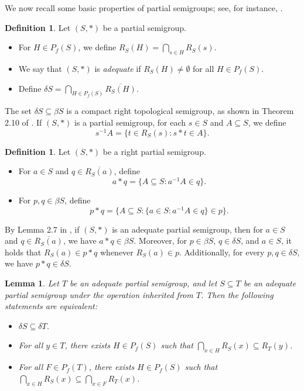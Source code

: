 \documentclass{amsart}
\newtheorem{lemma}[theorem]{Lemma}
\theoremstyle{definition}
\newtheorem{definition}[theorem]{Definition}
\theoremstyle{remark}
\numberwithin{equation}{section}
\begin{document}
We now recall some basic properties of partial semigroups; see, for instance, \cite{Hindman}.
\begin{definition}
	Let \((S, *)\) be a partial semigroup.
	\begin{itemize}
		\item[(a)] For \( H \in P_f(S) \), we define \( R_S(H) = \bigcap_{s \in H} R_S(s) \).	
		\item[(b)] We say that \((S, *)\) is \emph{adequate} if \( R_S(H) \neq \emptyset \) for all \( H \in P_f(S) \).
		\item[(c)] Define $\delta S = \bigcap_{H \in P_f(S)} \overline{R_S(H)}$.
	\end{itemize}
\end{definition}

The set $\delta S \subseteq \beta S$ is a compact right topological semigroup, as shown in Theorem 2.10 of \cite{McCutcheon}. If \((S, *)\) is a partial semigroup, for each \( s \in S \) and \( A \subseteq S \), we define 
\[
s^{-1}A = \{t \in R_S(s) : s * t \in A\}.
\]

\begin{definition}
	Let \( (S, *) \) be a right partial semigroup.
	\begin{itemize}
		\item[(a)] For \( a \in S \) and \( q \in \overline{R_S(a)} \), define
		\[
		a * q = \{A \subseteq S \colon a^{-1}A \in q\}.
		\]
		\item[(b)] For \( p, q \in \beta S \), define
		\[
		p * q = \{A \subseteq S \colon \{a \in S \colon a^{-1}A \in q\} \in p\}.
		\]
	\end{itemize}
\end{definition}
By Lemma 2.7 in \cite{McCutcheon}, if \( (S, *) \) is an adequate partial semigroup, then for \( a \in S \) and \( q \in \overline{R_S(a)} \), we have \( a * q \in \beta S \). Moreover, for \( p \in \beta S \), \( q \in \delta S \), and \( a \in S \), it holds that \( R_S(a) \in p * q \) whenever \( R_S(a) \in p \). Additionally, for every \( p, q \in \delta S \), we have \( p * q \in \delta S \).
\begin{lemma} \label{1.10} 
	Let \( T \) be an adequate partial semigroup, and let \( S \subseteq T \) be an adequate partial semigroup under the operation inherited from \( T \). Then the following statements are equivalent:
	\begin{itemize}
		\item[(a)] \( \delta S \subseteq \delta T \).
		\item[(b)] For all \( y \in T \), there exists \( H \in P_f(S) \) such that  
		\( \bigcap_{x \in H} R_S(x) \subseteq R_T(y) \).
		\item[(c)] For all \( F \in P_f(T) \), there exists \( H \in P_f(S) \) such that  
		\( \bigcap_{x \in H} R_S(x) \subseteq \bigcap_{x \in F} R_T(x) \).
	\end{itemize}
\end{lemma}
\end{document}
